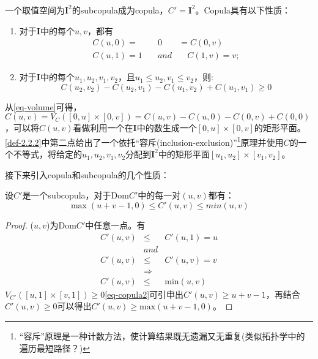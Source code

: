 \begin{definition}
    一个取值空间为$\mathbf{I}^2$的subcopula成为copula，$C' = \mathbf{I}^2$。Copula具有以下性质：
    \begin{enumerate}
        \item 对于$\mathbf{I}$中的每个$u,v$，都有
            \begin{eqnarray}
                C(u,0) = &0& = C(0,v) \\
                C(u,1) = 1 \quad &and& \quad C(1,v) = v;
                \label{eq-copula1}
            \end{eqnarray}
        \item 对于$\mathbf{I}$中的每个$u_1,u_2,v_1,v_2$，且$u_1 \leq u_2, v_1 \leq v_2$，则:
            \begin{equation}
                C(u_2,v_2) - C(u_2,v_1) - C(u_1,v_2)+C(u_1,v_1) \geq 0
                \label{eq-copula2}
            \end{equation}
    \end{enumerate}
    \label{def-2.2.2}
\end{definition}
从\cref{eq-volume}可得，$C(u,v)=V_C([0,u]\times[0,v]) = C(u,v)-C(u,0)-C(0,v)+C(0,0)$，可以将$C(u,v)$看做利用一个在$\mathbf{I}$中的数生成一个$[0,u]\times[0,v]$的矩形平面。\cref{def-2.2.2}中第二点给出了一个依托``容斥(\textcolor[rgb]{1,0,0}{inclusion-exclusion})''\footnote{``容斥''原理是一种计数方法，使计算结果既无遗漏又无重复(类似拓扑学中的遍历最短路径？)}原理并使用$C$的一个不等式，将给定的$u_1,u_2,v_1,v_2$分配到$\mathbf{I}^2$中的矩形平面$[u_1,u_2]\times[v_1,v_2]$。



接下来引入copula和subcopula的几个性质：
\begin{theorem}
    设$C'$是一个subcopula，对于Dom$C'$中的每一对$(u,v)$都有：
    \begin{equation}
        \max(u+v-1,0) \leq C'(u,v) \leq min(u,v)
        \label{eq-thr2.2.3}
    \end{equation}
    \label{thr2.2.3}
\end{theorem}

\begin{proof}
    ($u,v$)为Dom$C'$中任意一点。有
    \begin{eqnarray*}
        C'(u,v) &\leq& C'(u,1) = u \\
        &and& \\
        C'(u,v) &\leq& C'(u,v) = v \\
        &\Rightarrow& \\
        C'(u,v) &\leq& \text{min} (u,v)
    \end{eqnarray*}
    $V_{C'}([u,1]\times[v,1]) \geq 0$\cref{eq-copula2}可引申出$C'(u,v)\geq u+v-1$，再结合$C'(u,v) \geq 0$可以得出$C'(u,v)\geq \text{max}(u+v-1,0)$。
\end{proof}
    
